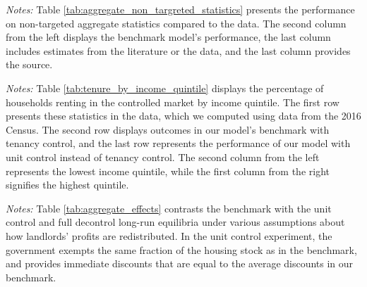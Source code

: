 \documentclass[parskip=full]{article}
\newenvironment{fignote2}[1]
{
\par
\medskip
\begin{minipage}{#1}
\footnotesize
}
{
\end{minipage}
}
\begin{document}
\begin{table}[H]
    \centering
    \caption{Aggregate non-targeted statistics}
    \vspace{-0.5cm}
    \label{tab:aggregate_non_targreted_statistics}  
    \vspace{-0.45cm}
    \begin{fignote2}{0.74\textwidth}
      \textit{Notes:} Table \ref{tab:aggregate_non_targreted_statistics} presents the performance on non-targeted aggregate statistics compared to the data. The second column from the left displays the benchmark model's performance, the last column includes estimates from the literature or the data, and the last column provides the source.
    \end{fignote2}
\end{table}

\begin{table}[H]
    \centering
    \caption{Households in controlled market by income quintile (all households)}
    \vspace{-0.5cm}
    \label{tab:tenure_by_income_quintile}    
    
    \vspace{-0.45cm}
    \begin{fignote2}{0.81\textwidth}
    \textit{Notes:} Table \ref{tab:tenure_by_income_quintile} displays the percentage of households renting in the controlled market by income quintile. The first row presents these statistics in the data, which we computed using data from the 2016 Census. The second row displays outcomes in our model's benchmark with tenancy control, and the last row represents the performance of our model with unit control instead of tenancy control. The second column from the left represents the lowest income quintile, while the first column from the right signifies the highest quintile.  
    \end{fignote2}
\end{table}

\begin{table}[H]
    \centering
    \caption{Aggregate effects generated by changes in rent-control policy conditional on redistribution efficiency}
    \vspace{-0.5cm}
    \label{tab:aggregate_effects}
    
    \vspace{-0.45cm}
    \begin{fignote2}{0.94\textwidth}
    \textit{Notes:} Table \ref{tab:aggregate_effects} contrasts the benchmark with the unit control and full decontrol long-run equilibria under various assumptions about how landlords' profits are redistributed. In the unit control experiment, the government exempts the same fraction of the housing stock as in the benchmark, and provides immediate discounts that are equal to the average discounts in our benchmark.
    \end{fignote2}
\end{table}
\end{document}

